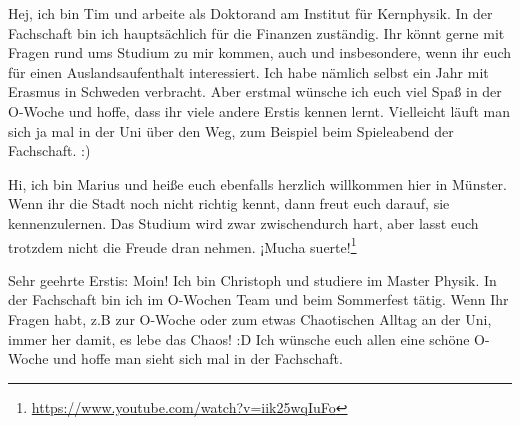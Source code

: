 \begin{multicols}{2}
\vspace{-0.5cm}

{
Hej, ich bin Tim und arbeite als Doktorand am Institut für Kernphysik. In der Fachschaft bin ich hauptsächlich für die Finanzen zuständig. Ihr könnt gerne mit Fragen rund ums Studium zu mir kommen, auch und insbesondere, wenn ihr euch für einen Auslandsaufenthalt interessiert. Ich habe nämlich selbst ein Jahr mit Erasmus in Schweden verbracht. Aber erstmal wünsche ich euch viel Spaß in der O-Woche und hoffe, dass ihr viele andere Erstis kennen lernt. Vielleicht läuft man sich ja mal in der Uni über den Weg, zum Beispiel beim Spieleabend der Fachschaft. :) 
}

{
Hi, ich bin Marius und heiße euch ebenfalls herzlich willkommen hier in Münster. Wenn ihr die Stadt noch nicht richtig kennt, dann freut euch darauf, sie kennenzulernen. 
Das Studium wird zwar zwischendurch hart, aber lasst euch trotzdem nicht die Freude dran nehmen. ¡Mucha suerte!\footnote{\url{https://www.youtube.com/watch?v=iik25wqIuFo}}
}


\vspace{-0.4cm}

{
Sehr geehrte Erstis: Moin!
Ich bin Christoph und studiere im Master Physik. In der Fachschaft bin ich im O-Wochen Team und beim Sommerfest tätig. Wenn Ihr Fragen habt, z.B zur O-Woche oder zum etwas Chaotischen Alltag an der Uni, immer her damit, es lebe das Chaos! :D 
Ich wünsche euch allen eine schöne O-Woche und hoffe man sieht sich mal in der Fachschaft.
}


\end{multicols}
